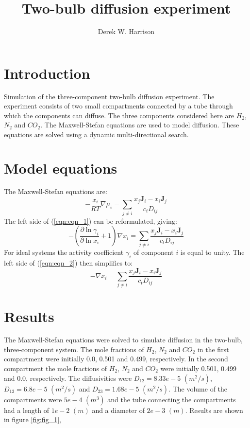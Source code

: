 \documentclass[11]{report}
\begin{document}
\author{Derek W. Harrison}
\title{Two-bulb diffusion experiment}
\maketitle

\section*{Introduction}
Simulation of the three-component two-bulb diffusion experiment. The experiment consists of two small compartments connected by a tube through which the components can diffuse. The three components considered here are $H_2$, $N_2$ and $CO_2$. The Maxwell-Stefan equations are used to model diffusion. These equations are solved using a dynamic multi-directional search.

\section*{Model equations}
The Maxwell-Stefan equations are:
\begin{equation}
\label{eqn:eqn_1}
-\frac{x_i}{RT} \nabla \mu_i = \sum_{j \neq i} \frac{x_j \textbf{J}_i - x_i \textbf{J}_j}{c_t D_{ij}}
\end{equation}
The left side of (\ref{eqn:eqn_1}) can be reformulated, giving:
\begin{equation}
\label{eqn:eqn_2}
-\left( \frac{\partial \ln{\gamma_i}}{\partial \ln{x_i}} + 1 \right) \nabla x_i = \sum_{j \neq i} \frac{x_j \textbf{J}_i - x_i \textbf{J}_j}{c_t D_{ij}}
\end{equation}
For ideal systems the activity coefficient $\gamma_i$ of component $i$ is equal to unity. The left side of (\ref{eqn:eqn_2}) then simplifies to:
\begin{equation}
\label{eqn:eqn_3}
- \nabla x_i = \sum_{j \neq i} \frac{x_j \textbf{J}_i - x_i \textbf{J}_j}{c_t D_{ij}}
\end{equation}

\section*{Results}
The Maxwell-Stefan equations were solved to simulate diffusion in the two-bulb, three-component system. The mole fractions of $H_2$, $N_2$ and $CO_2$ in the first compartment were initially 0.0, 0.501 and 0.499, respectively. In the second compartment the mole fractions of $H_2$, $N_2$ and $CO_2$ were initially 0.501, 0.499 and 0.0, respectively. The diffusivities were $D_{12} = 8.33e-5$  $(m^2/s)$, $D_{13} = 6.8e-5$ $(m^2/s)$ and $D_{23} = 1.68e-5$ $(m^2/s)$. The volume of the compartments were $5e-4$ $(m^3)$ and the tube connecting the compartments had a length of $1e-2$ $(m)$ and a diameter of $2e-3$ $(m)$. Results are shown in figure \ref{fig:fig_1}, 
\end{document}
